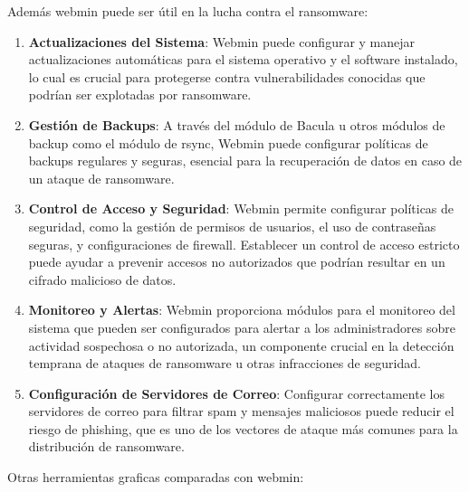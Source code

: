 Además webmin puede ser útil en la lucha contra el ransomware:
\begin{enumerate}
    \item \textbf{Actualizaciones del Sistema}: Webmin puede configurar y manejar actualizaciones automáticas para el sistema operativo y el software instalado, lo cual es crucial para protegerse contra vulnerabilidades conocidas que podrían ser explotadas por ransomware.
    \item \textbf{Gestión de Backups}: A través del módulo de Bacula u otros módulos de backup como el módulo de rsync, Webmin puede configurar políticas de backups regulares y seguras, esencial para la recuperación de datos en caso de un ataque de ransomware.
    \item \textbf{Control de Acceso y Seguridad}: Webmin permite configurar políticas de seguridad, como la gestión de permisos de usuarios, el uso de contraseñas seguras, y configuraciones de firewall. Establecer un control de acceso estricto puede ayudar a prevenir accesos no autorizados que podrían resultar en un cifrado malicioso de datos.
    \item \textbf{Monitoreo y Alertas}: Webmin proporciona módulos para el monitoreo del sistema que pueden ser configurados para alertar a los administradores sobre actividad sospechosa o no autorizada, un componente crucial en la detección temprana de ataques de ransomware u otras infracciones de seguridad.
    \item \textbf{Configuración de Servidores de Correo}: Configurar correctamente los servidores de correo para filtrar spam y mensajes maliciosos puede reducir el riesgo de phishing, que es uno de los vectores de ataque más comunes para la distribución de ransomware.
\end{enumerate}

Otras herramientas graficas comparadas con webmin:

